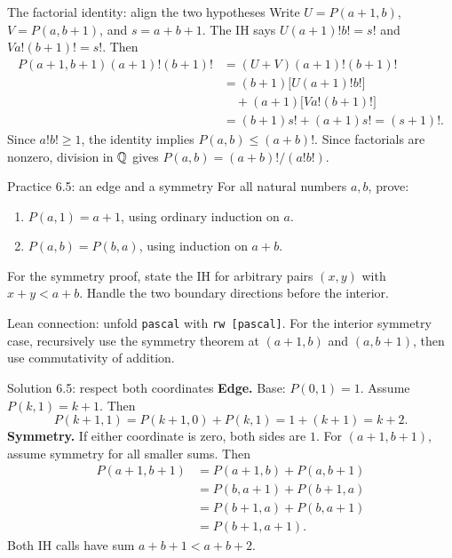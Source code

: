 \begin{frame}{The factorial identity: align the two hypotheses}
Write $U=P(a+1,b)$, $V=P(a,b+1)$, and $s=a+b+1$.
The IH says $U(a+1)!b!=s!$ and $Va!(b+1)!=s!$.
Then
\[
\begin{aligned}
 P(a+1,b+1)(a+1)!(b+1)!
 &=(U+V)(a+1)!(b+1)!\\
 &=(b+1)\bigl[U(a+1)!b!\bigr]\\
 &\quad +(a+1)\bigl[Va!(b+1)!\bigr]\\
 &=(b+1)s!+(a+1)s!=(s+1)!.
\end{aligned}
\]
Since $a!b!\ge1$, the identity implies $P(a,b)\le(a+b)!$.
Since factorials are nonzero, division in $\mathbb{Q}$ gives
$P(a,b)=(a+b)!/(a!b!)$.
\end{frame}

\begin{frame}{Practice 6.5: an edge and a symmetry}
For all natural numbers $a,b$, prove:
\begin{enumerate}
\item $P(a,1)=a+1$, using ordinary induction on $a$.
\item $P(a,b)=P(b,a)$, using induction on $a+b$.
\end{enumerate}
For the symmetry proof, state the IH for arbitrary pairs $(x,y)$ with
$x+y<a+b$. Handle the two boundary directions before the interior.

Lean connection: unfold \texttt{pascal} with \texttt{rw [pascal]}.
For the interior symmetry case, recursively use the symmetry theorem at
$(a+1,b)$ and $(a,b+1)$, then use commutativity of addition.
\end{frame}

\begin{frame}{Solution 6.5: respect both coordinates}
\textbf{Edge.} Base: $P(0,1)=1$. Assume $P(k,1)=k+1$. Then
\[
 P(k+1,1)=P(k+1,0)+P(k,1)=1+(k+1)=k+2.
\]
\textbf{Symmetry.} If either coordinate is zero, both sides are $1$.
For $(a+1,b+1)$, assume symmetry for all smaller sums. Then
\[
\begin{aligned}
 P(a+1,b+1)&=P(a+1,b)+P(a,b+1)\\
 &=P(b,a+1)+P(b+1,a)\\
 &=P(b+1,a)+P(b,a+1)\\
 &=P(b+1,a+1).
\end{aligned}
\]
Both IH calls have sum $a+b+1<a+b+2$.
\end{frame}

